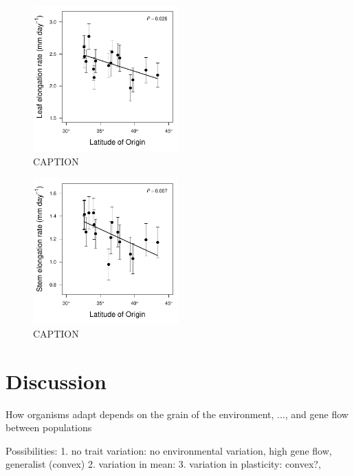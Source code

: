 \documentclass[11pt, oneside]{article}\usepackage[]{graphicx}\usepackage[]{color}
\begin{document}
\begin{figure}[h!]
	\centerline{\includegraphics[width=0.5\textwidth]{Figures/Figure_LLL_Lat.pdf}}
	\fontsize{10}{12}
	\selectfont
	\caption[Southern populations grow faster (leaf expansion rate).]{CAPTION}
	\label{fig:Fig_LLL}
\end{figure}

\begin{figure}
	\centerline{\includegraphics[width=0.5\textwidth]{Figures/Figure_Height_Lat.pdf}}
	\fontsize{10}{12}
	\selectfont
	\caption[Southern populations grow faster (stem elongation rate).]{CAPTION}
	\label{fig:Fig_height}
\end{figure}

\section*{Discussion}

How organisms adapt depends on the grain of the environment, ..., and gene flow between populations

Possibilities:
1. no trait variation: no environmental variation, high gene flow, generalist (convex)
2. variation in mean:
3. variation in plasticity: convex?,
\end{document}
